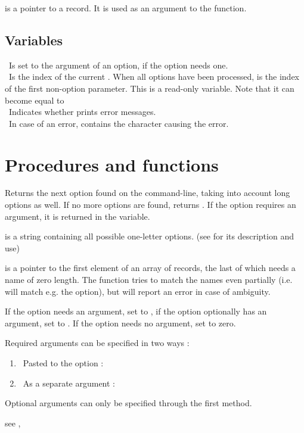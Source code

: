  is a pointer to a
 record. It is used as an argument to the 
function.

\subsection{Variables}
 \ Is set to the argument of an option, if the option needs
one.\\
 \ Is the index of the current . When
all options have been processed,  is the index of the first
non-option parameter. This is a read-only variable. Note that it can become
equal to \\
 \ Indicates whether  prints error
messages.\\
 \  In case of an error, contains the character causing the 
error.
\section {Procedures and functions}

{
Returns the next option found on the command-line, taking into account long
options as well. If no more options are
found, returns . If the option requires an argument, it is
returned in the  variable.

 is a string containing all possible one-letter options.
(see  for its description and use)

 is a pointer to the first element of an array of  
records, the last of which needs a name of zero length.  
The function tries to match the names even partially (i.e.  
will match e.g. the  option), but will report an error in case of
ambiguity.

If the option needs an argument, set  to
, if the option optionally has an argument, set
 to . If the option needs no argument,
set  to zero.


Required arguments can be specified in two ways : 
\begin{enumerate}
\item \ Pasted to the option : 
\item \ As a separate argument : 
\end{enumerate}
Optional arguments can only be specified through the first method.
}
{ see , }

